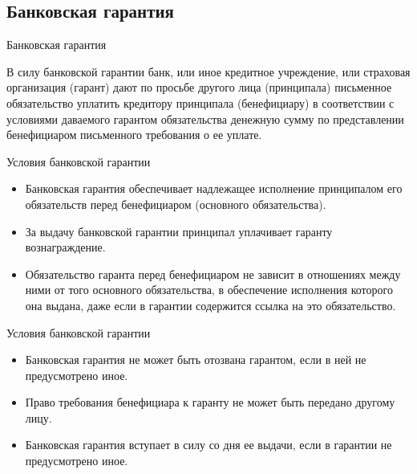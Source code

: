 \documentclass[_Banking_p3.tex]{subfiles}
\begin{document}
\subsection{Банковская гарантия}
\begin{frame} [ allowframebreaks]{Банковская гарантия}
\begin{block}{ }
\quad
В силу банковской гарантии банк, или иное кредитное учреждение, или страховая организация (гарант) дают по просьбе другого лица (принципала) письменное обязательство уплатить кредитору принципала (бенефициару) в соответствии с условиями даваемого гарантом обязательства денежную сумму по представлении бенефициаром письменного требования о ее уплате.
\end{block}
\end{frame}

\begin{frame}[ allowframebreaks ]{Условия банковской гарантии}
\begin{itemize}
\item
Банковская гарантия обеспечивает надлежащее исполнение принципалом его обязательств перед бенефициаром (основного обязательства).

\item
За выдачу банковской гарантии принципал уплачивает гаранту вознаграждение.

\pagebreak
\item
Обязательство гаранта перед бенефициаром не зависит в отношениях между ними от того основного обязательства, в обеспечение исполнения которого она выдана, даже если в гарантии содержится ссылка на это обязательство.
\end{itemize}
\end{frame}

\begin{frame}{Условия банковской гарантии}
\begin{itemize}[<+->]
\item
Банковская гарантия не может быть отозвана гарантом, если в ней не предусмотрено иное.

\item
Право требования бенефициара к гаранту не может быть передано другому лицу.

\item
Банковская гарантия вступает в силу со дня ее выдачи, если в гарантии не предусмотрено иное.
\end{itemize}
\end{frame}
\end{document}
